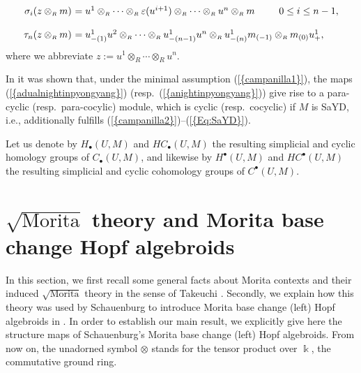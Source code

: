 \documentclass[reqno, a4paper, 10pt]{amsart}
\numberwithin{equation}{section}
\theoremstyle{plain}
\theoremstyle{definition}
\theoremstyle{remark}
\begin{document}
\begin{equation}
\begin{array}{rll}
\\
{\sigma}_i(z \otimes_{{\scriptscriptstyle{R}}} m) \!\!\!\! 
&= u^1 \otimes_{{\scriptscriptstyle{R}}} \cdots \otimes_{{\scriptscriptstyle{R}}}
{\varepsilon} (u^{i+1}) \otimes_{{\scriptscriptstyle{R}}} \cdots \otimes_{{\scriptscriptstyle{R}}} u^n \otimes_{{\scriptscriptstyle{R}}} m & \! \,
\hspace*{1pt} \hspace*{-2cm}  0 \leq i \leq n-1,
\\ 
\\
\tau_n(z \otimes_{{\scriptscriptstyle{R}}} m) \!\!\!\! 
&= u^1_{-(1)}u^2 \otimes_{{\scriptscriptstyle{R}}} \cdots \otimes_{{\scriptscriptstyle{R}}} u^1_{-(n-1)}u^n\otimes_{{\scriptscriptstyle{R}}} u^1_{-(n)}m_{(-1)} \otimes_{{\scriptscriptstyle{R}}} m_{(0)}u^1_+, & 
\end{array}
\end{equation}
where we abbreviate $z:=u^1 \otimes_{{\scriptscriptstyle{R}}}
\cdots \otimes_{{\scriptscriptstyle{R}}} u^n$. 

In \cite{KowKra:CSIACT} it was shown that, under the minimal assumption {{\rm (}\ref{{campanilla1}}{\rm )}}, the maps {{\rm (}\ref{{adualnightinpyongyang}}{\rm )}} (resp.~{{\rm (}\ref{{anightinpyongyang}}{\rm )}}) 
give rise to a para-cyclic (resp.~para-cocylic) module, which is cyclic (resp.~cocyclic) if $M$ is SaYD, i.e., additionally fulfills {{\rm (}\ref{{campanilla2}}{\rm )}}--{{\rm (}\ref{{Eq:SaYD}}{\rm )}}.

Let us denote by $H_{{\scriptscriptstyle{\bullet}}}(U,M)$ and $HC_{{\scriptscriptstyle{\bullet}}}(U,M)$ the resulting simplicial and cyclic homology groups of $C_{{\scriptscriptstyle{\bullet}}}(U,M)$, and likewise by  $H^{{\scriptscriptstyle{\bullet}}}(U,M)$ and $HC^{{\scriptscriptstyle{\bullet}}}(U,M)$ the resulting simplicial and cyclic cohomology groups of $C^{{\scriptscriptstyle{\bullet}}}(U,M)$.

 

\section{$\sqrt{\mbox{Morita}}$ theory and Morita base change Hopf algebroids}
In this section, we first recall some  general facts about Morita contexts and their induced $\sqrt{\mbox{Morita}}$ theory   in the sense of Takeuchi \cite{Tak:squareMorita}.  Secondly, we explain how this theory 
was used by Schauenburg to introduce Morita base change (left) Hopf algebroids in \cite{Schau:MBCIQG}. 
In order to establish our main result, we explicitly give here the structure maps of  Schauenburg's Morita  base change (left) Hopf algebroids.
From now on, the unadorned symbol $\otimes$  stands for the tensor product over ${{\Bbbk}}$, the commutative ground ring.
\end{document}
